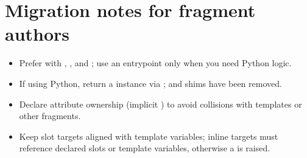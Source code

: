 \documentclass[a4paper,twoside]{article}
\begin{document}
\section{Migration notes for fragment authors}
\begin{itemize}
\item Prefer  with , , and ; use an entrypoint only when you need Python logic.
\item If using Python, return a  instance via ;  and  shims have been removed.
\item Declare attribute ownership (implicit ) to avoid collisions with templates or other fragments.
\item Keep slot targets aligned with template variables; inline targets must reference declared slots or template variables, otherwise a  is raised.
\end{itemize}
\end{document}
